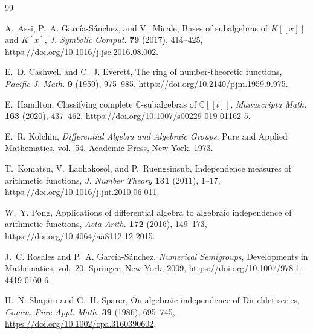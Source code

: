 \documentclass[11pt]{article}
\theoremstyle{definition}
\theoremstyle{remark}
\newcommand{\C}{\mathbb C}
\begin{document}
\begin{thebibliography}{99}

A.~Assi, P.~A. Garc\'{i}a-S\'{a}nchez, and V.~Micale,
\newblock Bases of subalgebras of $K[[x]]$ and $K[x]$,
\newblock \emph{J. Symbolic Comput.} \textbf{79} (2017), 414--425,
\newblock \url{https://doi.org/10.1016/j.jsc.2016.08.002}.

E.~D. Cashwell and C.~J. Everett,
\newblock The ring of number-theoretic functions,
\newblock \emph{Pacific J. Math.} \textbf{9} (1959), 975--985,
\newblock \url{https://doi.org/10.2140/pjm.1959.9.975}.

E.~Hamilton,
\newblock Classifying complete $\C$-subalgebras of $\C[[t]]$,
\newblock \emph{Manuscripta Math.} \textbf{163} (2020), 437--462,
\newblock \url{https://doi.org/10.1007/s00229-019-01162-5}.

E.~R. Kolchin,
\newblock \emph{Differential Algebra and Algebraic Groups},
\newblock Pure and Applied Mathematics, vol.~54, Academic Press, New York, 1973.

T.~Komatsu, V.~Laohakosol, and P.~Ruengsinsub,
\newblock Independence measures of arithmetic functions,
\newblock \emph{J. Number Theory} \textbf{131} (2011), 1--17,
\newblock \url{https://doi.org/10.1016/j.jnt.2010.06.011}.

W.~Y. Pong,
\newblock Applications of differential algebra to algebraic independence of arithmetic
functions,
\newblock \emph{Acta Arith.} \textbf{172} (2016), 149--173,
\newblock \url{https://doi.org/10.4064/aa8112-12-2015}.

J.~C. Rosales and P.~A. Garc\'{i}a-S\'{a}nchez,
\newblock \emph{Numerical Semigroups},
\newblock Developments in Mathematics, vol.~20, Springer, New York, 2009,
\newblock \url{https://doi.org/10.1007/978-1-4419-0160-6}.

H.~N. Shapiro and G.~H. Sparer,
\newblock On algebraic independence of Dirichlet series,
\newblock \emph{Comm. Pure Appl. Math.} \textbf{39} (1986), 695--745,
\newblock \url{https://doi.org/10.1002/cpa.3160390602}.

\end{thebibliography}
\end{document}
